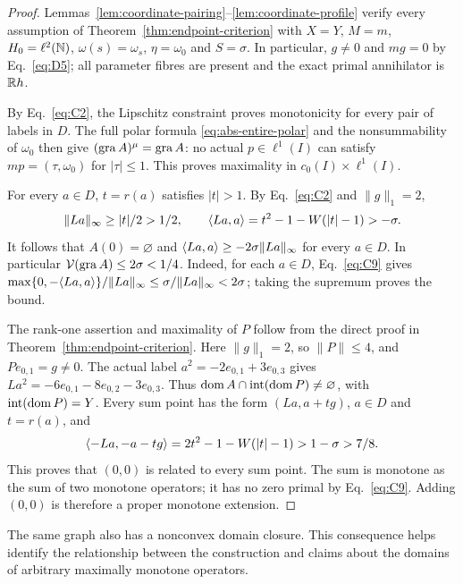 \begin{proof}
Lemmas~\ref{lem:coordinate-pairing}--\ref{lem:coordinate-profile}
verify every assumption of Theorem~\ref{thm:endpoint-criterion}
with $X=Y$, $M=m$, $H_0=\ell^2(\mathbb N)$, $\omega(s)=\omega_s$,
$\eta=\omega_0$ and $S=\sigma$. In particular, $g\ne0$ and $mg=0$
by Eq.~\eqref{eq:D5}; all parameter fibres are present and the
exact primal annihilator is $\mathbb R h$.

By Eq.~\eqref{eq:C2}, the Lipschitz constraint proves monotonicity
for every pair of labels in $D$. The full polar formula
\eqref{eq:abs-entire-polar} and the nonsummability of $\omega_0$
then give $(\operatorname{gra} A)^\mu=\operatorname{gra} A$: no actual $p\in\ell^1(I)$ can
satisfy $mp=(\tau,\omega_0)$ for $|\tau|\le1$. This proves
maximality in $c_0(I)\times\ell^1(I)$.

\label{sec:C5}
For every $a\in D$, $t=r(a)$ satisfies $|t|>1$. By Eq.~\eqref{eq:C2}
and $\|g\|_1=2$,
\begin{equation}
\|La\|_\infty\ge|t|/2>1/2,\qquad
\langle La,a\rangle=t^2-1-W(|t|-1)>-\sigma.
\label{eq:C9}
\end{equation}
It follows that $A(0)=\varnothing$ and
$\langle La,a\rangle\ge-2\sigma\|La\|_\infty$ for every $a\in D$.
In particular $\mathcal V(\operatorname{gra} A)\le2\sigma<1/4$.
Indeed, for each $a\in D$, Eq.~\eqref{eq:C9} gives
$\max\{0,-\langle La,a\rangle\}/\|La\|_\infty
\le\sigma/\|La\|_\infty<2\sigma$; taking the supremum proves the bound.

\label{sec:C6}
The rank-one assertion and maximality of $P$ follow from the direct
proof in Theorem~\ref{thm:endpoint-criterion}. Here $\|g\|_1=2$,
so $\|P\|\le4$, and $Pe_{0,1}=g\ne0$.
The actual label $a^2=-2e_{0,1}+3e_{0,3}$ gives
$La^2=-6e_{0,1}-8e_{0,2}-3e_{0,3}$. Thus
$\operatorname{dom} A\cap\operatorname{int}(\operatorname{dom} P)\ne\varnothing$, with
$\operatorname{int}(\operatorname{dom} P)=Y$. Every sum point has the form
$(La,a+tg)$, $a\in D$ and $t=r(a)$, and
\begin{equation}
\langle -La,-a-tg\rangle=2t^2-1-W(|t|-1)>1-\sigma>7/8.
\label{eq:C11}
\end{equation}
This proves that $(0,0)$ is related to every sum point. The sum is
monotone as the sum of two monotone operators; it has no zero primal by
Eq.~\eqref{eq:C9}. Adding $(0,0)$ is therefore a proper monotone extension.

\end{proof}

\label{sec:domain-comparison}
The same graph also has a nonconvex domain closure. This consequence
helps identify the relationship between the construction and claims
about the domains of arbitrary maximally monotone operators.

